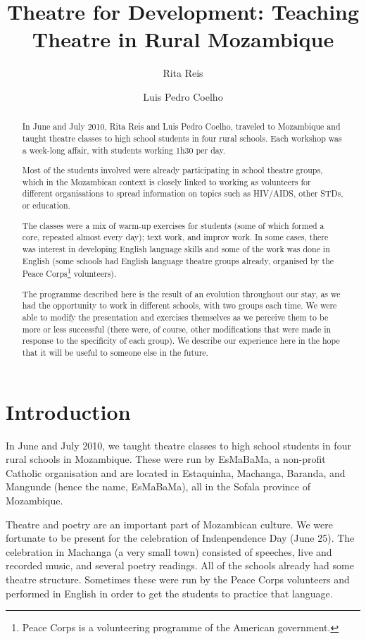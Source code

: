 \documentclass[article,twoside]{memoir}
\title{Theatre for Development: Teaching Theatre in Rural Mozambique}
\author{Rita Reis \and Luis Pedro Coelho}
\begin{document}
\begin{abstract}
In June and July 2010, Rita Reis and Luis Pedro Coelho, traveled to Mozambique
and taught theatre classes to high school students in four rural schools. Each
workshop was a week-long affair, with students working 1h30 per day.

Most of the students involved were already participating in school theatre
groups, which in the Mozambican context is closely linked to working as
volunteers for different organisations to spread information on topics such as
HIV/AIDS, other STDs, or education.

The classes were a mix of warm-up exercises for students (some of which formed
a core, repeated almost every day); text work, and improv work. In some cases,
there was interest in developing English language skills and some of the work
was done in English (some schools had English language theatre groups already,
organised by the Peace Corps\footnote{Peace Corps is a volunteering programme
of the American government.} volunteers).

The programme described here is the result of an evolution throughout our stay,
as we had the opportunity to work in different schools, with two groups each
time. We were able to modify the presentation and exercises themselves as we
perceive them to be more or less successful (there were, of course, other
modifications that were made in response to the specificity of each group). We
describe our experience here in the hope that it will be useful to someone else
in the future.

\end{abstract}

\chapter{Introduction}
In June and July 2010, we taught theatre classes to high school students in
four rural schools in Mozambique. These were run by EsMaBaMa, a non-profit
Catholic organisation and are located in Estaquinha, Machanga, Baranda, and
Mangunde (hence the name, EsMaBaMa), all in the Sofala province of Mozambique.

Theatre and poetry are an important part of Mozambican culture. We were
fortunate to be present for the celebration of Indenpendence Day
(June 25). The celebration in Machanga (a very small town) consisted of
speeches, live and recorded music, and several poetry readings. All of the
schools already had some theatre structure. Sometimes these were run by the
Peace Corps volunteers and performed in English in order to get the students to
practice that language.
\end{document}
